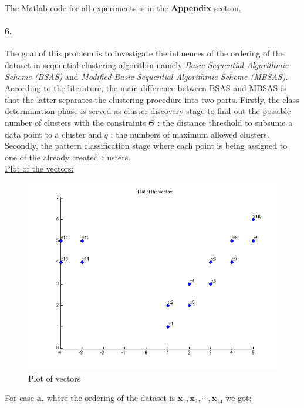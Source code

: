 \documentclass[a4paper]{article}
\begin{document}
\setcounter{page}{6}

\noindent The Matlab code for all experiments is in the \textbf{Appendix} section.

\paragraph{6.} The goal of this problem is to investigate the influences of the ordering of the dataset in sequential clustering algorithm namely \emph{Basic Sequential Algorithmic Scheme (BSAS)} and \emph{Modified Basic Sequential Algorithmic Scheme (MBSAS)}. According to the literature, the main difference between BSAS and MBSAS is that the latter separates the clustering procedure into two parts. Firstly, the class determination phase is served as cluster discovery stage to find out the possible number of clusters with the constraints $\Theta$ : the distance threshold to subsume a data point to a cluster and $q$ : the numbers of maximum allowed clusters. Secondly, the pattern classification stage where each point is being assigned to one of the already created clusters. \\

	\underline{Plot of the vectors:}
	
	\begin{figure}[H]
	  \centering
	    \includegraphics[scale=.57]{images/vectors.png}
	  \caption{Plot of vectors}
	  \label{fig:vectors}
	\end{figure}

	For case \textbf{a.} where the ordering of the dataset is $\mathbf{x}_1, \mathbf{x}_2,\cdots, \mathbf{x}_{14}$ we got:
	
\end{document}

